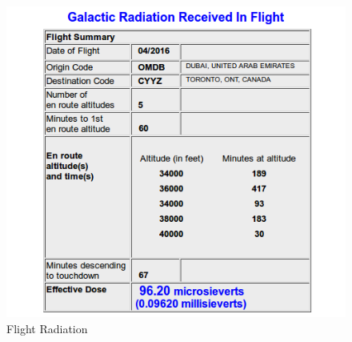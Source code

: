 \documentclass[english]{article}
\begin{document}
\begin{figure}[!htb]
  \includegraphics[width=\linewidth]{DXB-TO-YYZ-RADIATION.png}
  \caption*{Flight Radiation}
\endminipage
\end{figure}
\end{document}

